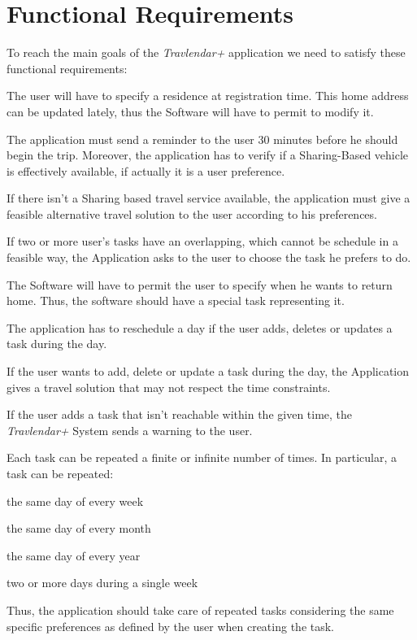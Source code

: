 \newcommand{\tabitem}{~~\llap{\textbullet}~~}

\section{Functional Requirements}
To reach the main goals of the \emph{Travlendar+} application we need to satisfy these functional requirements:

\begin{requirementList}
	\item The user will have to specify a residence at registration time. This home address can be updated lately, thus the Software will have to permit to modify it. 
   
	\item The application must send a reminder to the user 30 minutes before he should begin the trip. Moreover, the application has to verify if a Sharing-Based vehicle is effectively available, if actually it is a user preference.
    
    \item If there isn't a Sharing based travel service available, the application must give a feasible alternative travel solution to the user according to his preferences.
    
    \item If two or more user's tasks have an overlapping, which cannot be schedule in a feasible way, the Application asks to the user to choose the task he prefers to do.
    
    \item The Software will have to permit the user to specify when he wants to return home. Thus, the software should have a special task representing it.
    
    \item The application has to reschedule a day if the user adds, deletes or updates a task during the day.
    
    \item If the user wants to add, delete or update a task during the day, the Application gives a travel solution that may not respect the time constraints.
    
    \item If the user adds a task that isn't reachable within the given time, the \emph{Travlendar+} System sends a warning to the user. 
    
    \item Each task can be repeated a finite or infinite number of times. In particular, a task can be repeated:
    \begin{enumerate}[label={[}R 9.\arabic*{]}:]
    \item the same day of every week
    \item the same day of every month
    \item the same day of every year
    \item two or more days during a single week
    \end{enumerate}
    Thus, the application should take care of repeated tasks considering the same specific preferences as defined by the user when creating the task.
    

\end{requirementList}
